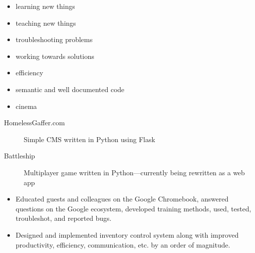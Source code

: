\documentclass[letterpaper]{article}        %
\begin{document}
\begin{multicols}{3}
      \begin{itemize}
        \item learning new things
        \item teaching new things
        \item troubleshooting problems
        \item working towards solutions
        \item efficiency
        \item semantic and well documented code
        \end{itemize}
    
      \begin{itemize}
        \item cinema
        \end{itemize}
    
    
  \end{multicols}


  \begin{description}
    \item[HomelessGaffer.com] Simple CMS written in Python using Flask
    \item[Battleship] Multiplayer game written in Python---currently being rewritten as a web app
    
  \end{description}


  
    \begin{itemize}
    \item Educated guests and colleagues on the Google Chromebook, answered questions on the Google ecosystem, developed training methods, used, tested, troubleshot, and reported bugs.
    \end{itemize}
  
    \begin{itemize}
    \item Designed and implemented inventory control system along with improved productivity, efficiency, communication, etc. by an order of magnitude.
    \end{itemize}
  
\end{document}
